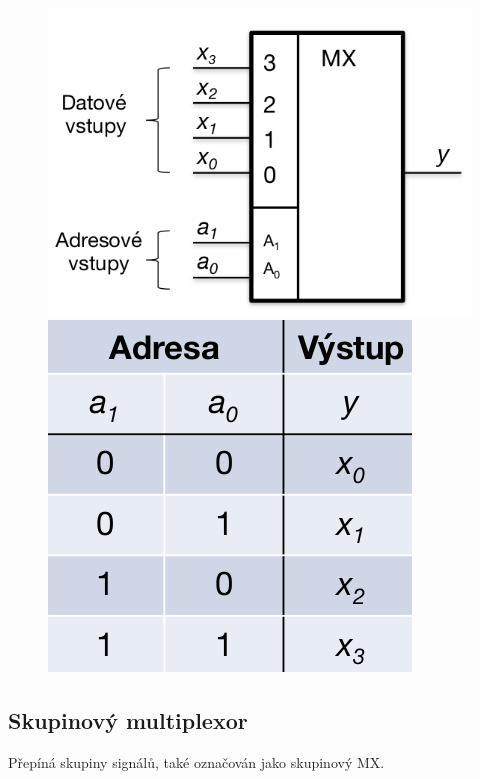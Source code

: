 \begin{figure}[h!]
    \centering
    \begin{minipage}[b]{0.4\textwidth}
        \includegraphics[width=\textwidth]{img/Multiplexor.png}
    \end{minipage}
    \hfill
    \begin{minipage}[b]{0.4\textwidth}
        \includegraphics[scale = 0.3]{img/MultiTab.png}
    \end{minipage}
\end{figure}

\subsection{Skupinový multiplexor}
Přepíná skupiny signálů, také označován jako skupinový MX.\\

